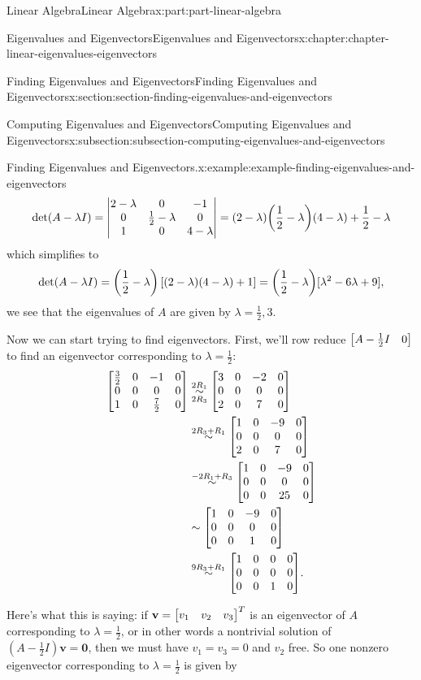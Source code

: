 \documentclass[twoside,10pt,]{book}
\numberwithin{equation}{part}
\providecommand{\vb}[1]{\mathbf{#1}}
\newcommand{\rowop}[2][]{\overset{#2}{\underset{#1}{\sim}}}
\begin{document}
\begin{partptx}{Linear Algebra}{}{Linear Algebra}{}{}{x:part:part-linear-algebra}
\begin{chapterptx}{Eigenvalues and Eigenvectors}{}{Eigenvalues and Eigenvectors}{}{}{x:chapter:chapter-linear-eigenvalues-eigenvectors}
\begin{sectionptx}{Finding Eigenvalues and Eigenvectors}{}{Finding Eigenvalues and Eigenvectors}{}{}{x:section:section-finding-eigenvalues-and-eigenvectors}
\begin{subsectionptx}{Computing Eigenvalues and Eigenvectors}{}{Computing Eigenvalues and Eigenvectors}{}{}{x:subsection:subsection-computing-eigenvalues-and-eigenvectors}
\begin{example}{Finding Eigenvalues and Eigenvectors.}{x:example:example-finding-eigenvalues-and-eigenvectors}
\begin{equation*}
\det(A-\lambda I) = \mqty|2-\lambda & 0 & -1 \\ 0 & \frac{1}{2}-\lambda & 0 \\ 1 & 0 & 4-\lambda| = (2-\lambda)\qty(\frac{1}{2}-\lambda)(4-\lambda) + \frac{1}{2}-\lambda 
\end{equation*}
which simplifies to%
\begin{equation*}
\det(A-\lambda I) = \qty(\frac{1}{2}-\lambda)\left[(2-\lambda)(4-\lambda)+1\right] = \qty(\frac{1}{2}-\lambda)[\lambda^{2}-6\lambda+9],
\end{equation*}
we see that the eigenvalues of \(A\) are given by \(\lambda=\frac{1}{2},3\).%
\par
Now we can start trying to find eigenvectors. First, we'll row reduce \(\mqty[A-\frac{1}{2}I & 0]\) to find an eigenvector corresponding to \(\lambda=\frac{1}{2}\):%
\begin{align*}
\mqty[\frac{3}{2} & 0 & -1 & 0 \\ 0 & 0 & 0 & 0 \\ 1 & 0 & \frac{7}{2} & 0] &\rowop[2R_{3}]{2R_{1}}\mqty[3 & 0 & -2 & 0 \\ 0 & 0 & 0 & 0 \\ 2 & 0 & 7 & 0]\\
&\rowop{2R_{3}+R_{1}}\mqty[1 & 0 & -9 & 0 \\ 0 & 0 & 0 & 0 \\ 2 & 0 & 7 & 0]\\
&\rowop{-2R_{1}+R_{3}}\mqty[1 & 0 & -9 & 0 \\ 0 & 0 & 0 & 0 \\ 0 & 0 & 25 & 0]\\
&\sim\mqty[1 & 0 & -9 & 0 \\ 0 & 0 & 0 & 0 \\ 0 & 0 & 1 & 0]\\
&\rowop{9R_{3}+R_{1}}\mqty[1 & 0 & 0 & 0 \\ 0 & 0 & 0 & 0 \\ 0 & 0 & 1 & 0].
\end{align*}
%
\par
Here's what this is saying: if \(\vb{v} = \mqty[\xmat*{v}{1}{3}]^{T}\) is an eigenvector of \(A\) corresponding to \(\lambda=\frac{1}{2}\), or in other words a nontrivial solution of \((A-\frac{1}{2}I)\vb{v} = \vb{0}\), then we must have \(v_{1} = v_{3} = 0\) and \(v_{2}\) free. So one nonzero eigenvector corresponding to \(\lambda=\frac{1}{2}\) is given by%
\begin{equation*}

\end{equation*}
\end{example}
\end{subsectionptx}
\end{sectionptx}
\end{chapterptx}
\end{partptx}
\end{document}
